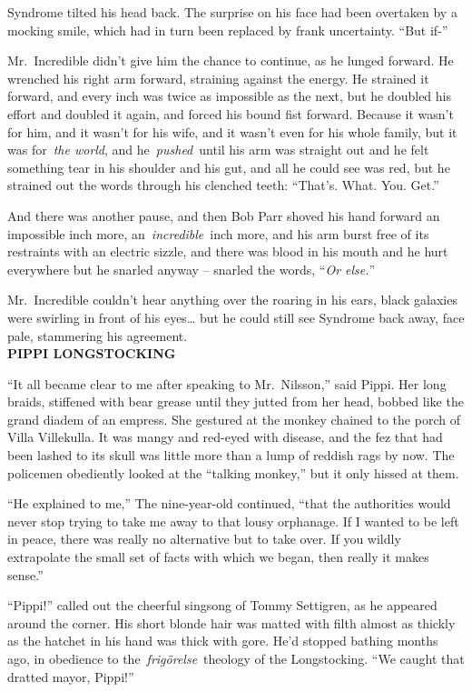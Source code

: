 Syndrome tilted his head back. The surprise on his face had been
overtaken by a mocking smile, which had in turn been replaced by frank
uncertainty. ``But if-''

Mr.~Incredible didn't give him the chance to continue, as he lunged
forward. He wrenched his right arm forward, straining against the
energy. He strained it forward, and every inch was twice as impossible
as the next, but he doubled his effort and doubled it again, and forced
his bound fist forward. Because it wasn't for him, and it wasn't for his
wife, and it wasn't even for his whole family, but it was for~\emph{the
world}, and he~\emph{pushed}~until his arm was straight out and he felt
something tear in his shoulder and his gut, and all he could see was
red, but he strained out the words through his clenched teeth: ``That's.
What. You. Get.''

And there was another pause, and then Bob Parr shoved his hand forward
an impossible inch more, an~\emph{incredible}~inch more, and his arm
burst free of its restraints with an electric sizzle, and there was
blood in his mouth and he hurt everywhere but he snarled anyway --
snarled the words, ``\emph{Or else.}''

Mr.~Incredible couldn't hear anything over the roaring in his ears,
black galaxies were swirling in front of his eyes\ldots{} but he could
still see Syndrome back away, face pale, stammering his agreement.\\

\textbf{PIPPI LONGSTOCKING}

``It all became clear to me after speaking to Mr.~Nilsson,'' said Pippi.
Her long braids, stiffened with bear grease until they jutted from her
head, bobbed like the grand diadem of an empress. She gestured at the
monkey chained to the porch of Villa Villekulla. It was mangy and
red-eyed with disease, and the fez that had been lashed to its skull was
little more than a lump of reddish rags by now. The policemen obediently
looked at the ``talking monkey,'' but it only hissed at them.

``He explained to me,'' The nine-year-old continued, ``that the
authorities would never stop trying to take me away to that lousy
orphanage. If I wanted to be left in peace, there was really no
alternative but to take over. If you wildly extrapolate the small set of
facts with which we began, then really it makes sense.''

``Pippi!'' called out the cheerful singsong of Tommy Settigren, as he
appeared around the corner. His short blonde hair was matted with filth
almost as thickly as the hatchet in his hand was thick with gore. He'd
stopped bathing months ago, in obedience to
the~\emph{frigörelse}~theology of the Longstocking. ``We caught that
dratted mayor, Pippi!''

